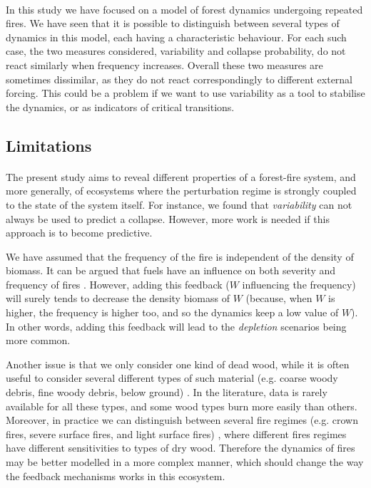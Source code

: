 \documentclass{article}
\begin{document}
\paragraph{} %
In this study we have focused on a model of forest dynamics undergoing repeated fires. We have seen that it is possible to distinguish between several types of dynamics in this model, each having a characteristic behaviour. For each such case, the two measures considered, variability and collapse probability, do not react similarly when frequency increases. Overall these two measures are sometimes dissimilar, as they do not react correspondingly to different external forcing. This could be a problem if we want to use variability as a tool to stabilise the dynamics, or as indicators of critical transitions.

\subsection{Limitations}

\paragraph{}
The present study aims to reveal different properties of a forest-fire system, and more generally, of ecosystems where the perturbation regime is strongly coupled to the state of the system itself. For instance, we found that \textit{variability} can not always be used to predict a collapse. However, more work is needed if this approach is to become predictive.

\label{discussion_frequency_ass}
We have assumed that the frequency of the fire is independent of the density of biomass. It can be argued that fuels have an influence on both severity and frequency  of fires \citep{schoennagel_interaction_2004}. However, adding this feedback ($W$ influencing the frequency) will surely tends to decrease the density biomass of $W$ (because, when $W$ is higher, the frequency is higher too, and so the dynamics keep a low value of $W$). In other words, adding this feedback will lead to the \textit{depletion} scenarios being more common.

Another issue is that we only consider one kind of dead wood, while it is often useful to consider several different types of such material (e.g. coarse woody debris, fine woody debris, below ground) \citep{russell_quantifying_2015}. In the literature, data is rarely available for all these types, and some wood types burn more easily than others. Moreover, in practice we can distinguish between several fire regimes (e.g.  crown fires, severe surface fires, and light surface fires) \citep{reichle_fire_1981}, where different fires regimes have different sensitivities to types of dry wood. Therefore the dynamics of fires may be better modelled in a more complex manner, which should change the way the feedback mechanisms works in this ecosystem.
\end{document}
